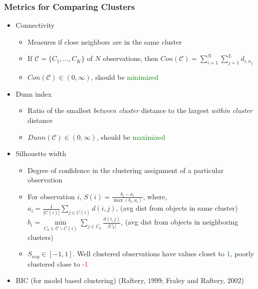 \documentclass[10pt,dvipsnames,table, handout]{beamer} %
\begin{document}
\begin{frame}
\frametitle{Metrics for Comparing Clusters}
\begin{itemize}
\pause \item Connectivity
\begin{itemize}
\item Measures if close neighbors are in the same cluster
\item If $\mathcal{C} = \{C_1, \dots, C_K \}$ of $N$ observations, then $Con(\mathcal{C}) = \sum\limits_{i=1}^{N} \sum\limits_{j=1}^{L} d_{i, n_j}$
\item $Con(\mathcal{C}) \in (0, \infty)$, should be \textcolor{green}{minimized} 
\end{itemize}
\pause \item Dunn index
\begin{itemize}
\item Ratio of the smallest {\emph{between cluster}} distance to the largest {\emph{within cluster}} distance
\item $Dunn(\mathcal{C}) \in (0, \infty)$, should be \textcolor{green}{maximized} 
\end{itemize}
\pause \item Silhouette width
\begin{itemize}
\item Degree of confidence in the clustering assignment of a particular observation
\item For observation $i$, $S(i) = \frac{b_i - a_i}{\max(b_i,a_i)}$, where, \\
$a_i = \frac{1}{|C(i)|}\sum\limits_{j \in C(i)}d(i,j)$, {\footnotesize (avg dist from objects in same cluster)} \\
$b_i = \min \limits_{C_k \in \mathcal{C} \backslash C(i) }\sum\limits_{j \in C_k}\frac{d(i,j)}{|C_k|}$, {\footnotesize(avg dist from objects in neighboring clusters)} \\
\item $S_{avg} \in [-1, 1]$. Well clustered observations have values closet to \textcolor{green}{1}, poorly clustered close to \textcolor{red}{-1}
\end{itemize}
\pause \item BIC (for model based clustering) (Raftery, 1999; Fraley and Raftery, 2002)
\end{itemize}
\end{frame}
\end{document}
